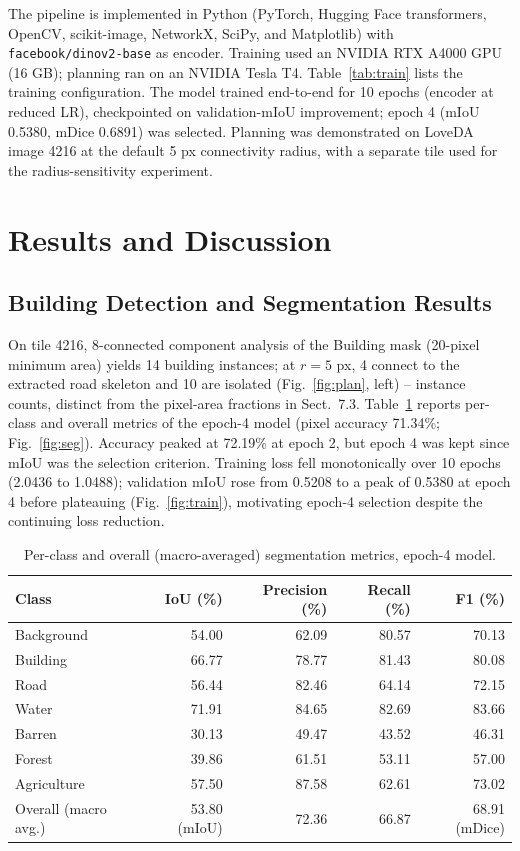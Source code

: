 \documentclass[runningheads]{llncs}
\begin{document}
The pipeline is implemented in Python (PyTorch, Hugging Face transformers, OpenCV, scikit-image, NetworkX, SciPy, and Matplotlib) with \texttt{facebook/dinov2-base} as encoder. Training used an NVIDIA RTX A4000 GPU (16 GB); planning ran on an NVIDIA Tesla T4. Table~\ref{tab:train} lists the training configuration. The model trained end-to-end for 10 epochs (encoder at reduced LR), checkpointed on validation-mIoU improvement; epoch 4 (mIoU 0.5380, mDice 0.6891) was selected. Planning was demonstrated on LoveDA image 4216 at the default 5 px connectivity radius, with a separate tile used for the radius-sensitivity experiment.

\section{Results and Discussion}
\subsection{Building Detection and Segmentation Results}
On tile 4216, 8-connected component analysis of the Building mask (20-pixel minimum area) yields 14 building instances; at $r=5$ px, 4 connect to the extracted road skeleton and 10 are isolated (Fig.~\ref{fig:plan}, left) -- instance counts, distinct from the pixel-area fractions in Sect.~7.3. Table~\ref{tab:seg} reports per-class and overall metrics of the epoch-4 model (pixel accuracy 71.34\%; Fig.~\ref{fig:seg}). Accuracy peaked at 72.19\% at epoch 2, but epoch 4 was kept since mIoU was the selection criterion. Training loss fell monotonically over 10 epochs (2.0436 to 1.0488); validation mIoU rose from 0.5208 to a peak of 0.5380 at epoch 4 before plateauing (Fig.~\ref{fig:train}), motivating epoch-4 selection despite the continuing loss reduction.

\begin{table}[!htbp]
\caption{Per-class and overall (macro-averaged) segmentation metrics, epoch-4 model.}\label{tab:seg}
\centering\footnotesize
\begin{tabular}{lrrrr}
\toprule
Class & IoU (\%) & Precision (\%) & Recall (\%) & F1 (\%)\\
\midrule
Background & 54.00 & 62.09 & 80.57 & 70.13\\
Building & 66.77 & 78.77 & 81.43 & 80.08\\
Road & 56.44 & 82.46 & 64.14 & 72.15\\
Water & 71.91 & 84.65 & 82.69 & 83.66\\
Barren & 30.13 & 49.47 & 43.52 & 46.31\\
Forest & 39.86 & 61.51 & 53.11 & 57.00\\
Agriculture & 57.50 & 87.58 & 62.61 & 73.02\\
\midrule
Overall (macro avg.) & 53.80 (mIoU) & 72.36 & 66.87 & 68.91 (mDice)\\
\bottomrule
\end{tabular}
\end{table}
\end{document}
